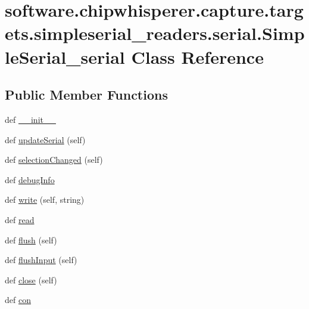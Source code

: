 \hypertarget{classsoftware_1_1chipwhisperer_1_1capture_1_1targets_1_1simpleserial__readers_1_1serial_1_1SimpleSerial__serial}{}\section{software.\+chipwhisperer.\+capture.\+targets.\+simpleserial\+\_\+readers.\+serial.\+Simple\+Serial\+\_\+serial Class Reference}
\label{classsoftware_1_1chipwhisperer_1_1capture_1_1targets_1_1simpleserial__readers_1_1serial_1_1SimpleSerial__serial}
\subsection*{Public Member Functions}
\begin{DoxyCompactItemize}
\item 
def \hyperlink{classsoftware_1_1chipwhisperer_1_1capture_1_1targets_1_1simpleserial__readers_1_1serial_1_1SimpleSerial__serial_accf63efa85b940d4b78a45ecea9af8a1}{\+\_\+\+\_\+init\+\_\+\+\_\+}
\item 
def \hyperlink{classsoftware_1_1chipwhisperer_1_1capture_1_1targets_1_1simpleserial__readers_1_1serial_1_1SimpleSerial__serial_a41f1103165ba4ae0e675d3c93420f2e0}{update\+Serial} (self)
\item 
def \hyperlink{classsoftware_1_1chipwhisperer_1_1capture_1_1targets_1_1simpleserial__readers_1_1serial_1_1SimpleSerial__serial_a44a02f752f6a10fe06483b1c87135f92}{selection\+Changed} (self)
\item 
def \hyperlink{classsoftware_1_1chipwhisperer_1_1capture_1_1targets_1_1simpleserial__readers_1_1serial_1_1SimpleSerial__serial_af1319ed802f99035605f556afb9eef13}{debug\+Info}
\item 
def \hyperlink{classsoftware_1_1chipwhisperer_1_1capture_1_1targets_1_1simpleserial__readers_1_1serial_1_1SimpleSerial__serial_a5006746c6310fff43b7ab8f496e26704}{write} (self, string)
\item 
def \hyperlink{classsoftware_1_1chipwhisperer_1_1capture_1_1targets_1_1simpleserial__readers_1_1serial_1_1SimpleSerial__serial_a641a9cc4c4d4d51b9dd29b075cb90713}{read}
\item 
def \hyperlink{classsoftware_1_1chipwhisperer_1_1capture_1_1targets_1_1simpleserial__readers_1_1serial_1_1SimpleSerial__serial_a9165b41324f15b34d0db067cfb018f68}{flush} (self)
\item 
def \hyperlink{classsoftware_1_1chipwhisperer_1_1capture_1_1targets_1_1simpleserial__readers_1_1serial_1_1SimpleSerial__serial_a7d00714a166a0dce6d4e0d8c9d3d271b}{flush\+Input} (self)
\item 
def \hyperlink{classsoftware_1_1chipwhisperer_1_1capture_1_1targets_1_1simpleserial__readers_1_1serial_1_1SimpleSerial__serial_ad5dbc376485ba62eea88d1ebba0dfcca}{close} (self)
\item 
def \hyperlink{classsoftware_1_1chipwhisperer_1_1capture_1_1targets_1_1simpleserial__readers_1_1serial_1_1SimpleSerial__serial_a98c315a76c82ec6e0889d944061a908a}{con}
\end{DoxyCompactItemize}
